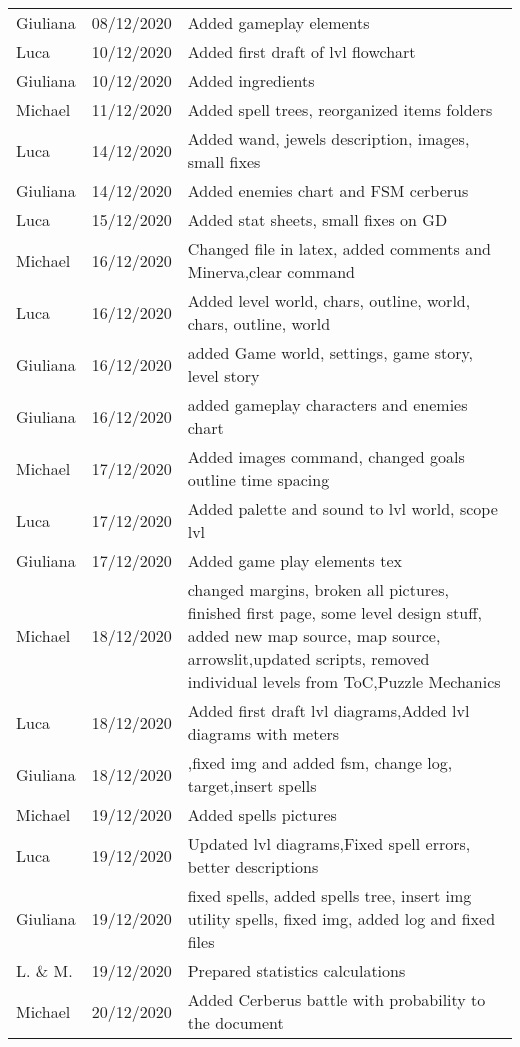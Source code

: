 \begin{longtable}{ m{2cm}m{3cm}m{8cm}}
Giuliana & 08/12/2020 & Added gameplay elements\\
Luca     & 10/12/2020 & Added first draft of lvl flowchart\\
Giuliana & 10/12/2020 & Added ingredients\\
Michael  & 11/12/2020 & Added spell trees, reorganized items folders\\
Luca     & 14/12/2020 & Added wand, jewels description, images, small fixes \\
Giuliana & 14/12/2020 & Added enemies chart and FSM cerberus\\
Luca     & 15/12/2020 & Added stat sheets, small fixes on GD\\
Michael  & 16/12/2020 & Changed file in latex, added comments and Minerva,clear command \\
Luca     & 16/12/2020 & Added level world, chars, outline, world, chars, outline, world\\
Giuliana & 16/12/2020 & added Game world, settings, game story, level story\\
Giuliana & 16/12/2020 & added gameplay characters and enemies chart\\
Michael  & 17/12/2020 & Added images command, changed goals outline time spacing\\
Luca     & 17/12/2020 & Added palette and sound to lvl world, scope lvl\\
Giuliana & 17/12/2020 & Added game play elements tex\\
Michael  & 18/12/2020 & changed margins, broken all pictures, finished first page, some level design stuff, added new map source, map source, arrowslit,updated scripts, removed individual levels from ToC,Puzzle Mechanics\\
Luca     & 18/12/2020 & Added first draft lvl diagrams,Added lvl diagrams with meters\\
Giuliana & 18/12/2020 & ,fixed img and added fsm, change log, target,insert spells\\
Michael  & 19/12/2020 & Added spells pictures\\
Luca     & 19/12/2020 & Updated lvl diagrams,Fixed spell errors, better descriptions\\
Giuliana & 19/12/2020 & fixed spells, added spells tree, insert img utility spells, fixed img, added log and fixed files\\
L. \& M. & 19/12/2020 & Prepared statistics calculations\\
Michael  & 20/12/2020 & Added Cerberus battle with probability to the document\\
\end{longtable}
\pagebreak
